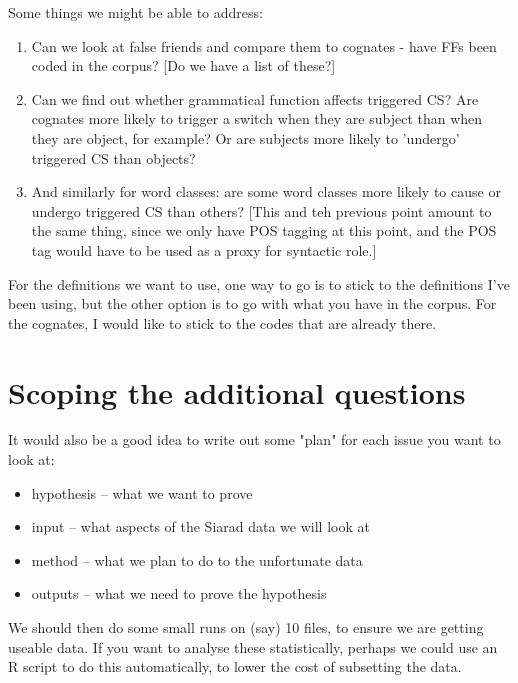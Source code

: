 \documentclass[a4paper,10pt]{article}
\begin{document}
Some things we might be able to address:
\begin{enumerate}
\item Can we look at false friends and compare them to cognates - have FFs been coded in the corpus? [Do we have a list of these?]
\item Can we find out whether grammatical function affects triggered CS? Are cognates more likely to trigger a switch when they are subject than when they are object, for example? Or are subjects more likely to 'undergo' triggered CS than objects?
\item And similarly for word classes: are some word classes more likely to cause or undergo triggered CS than others? [This and teh previous point amount to the same thing, since we only have POS tagging at this point, and the POS tag would have to be used as a proxy for syntactic role.]                                                                                                                \end{enumerate}

For the definitions we want to use, one way to go is to stick to the definitions I've been using, but the other option is to go with what you have in the corpus. For the cognates, I would like to stick to the codes that are already there.


\section{Scoping the additional questions}

It would also be a good idea to write out some "plan" for each issue you want 
to look at:
\begin{itemize}
\itemsep-0.4em 
\item hypothesis -- what we want to prove
\item input -- what aspects of the Siarad data we will look at
\item method -- what we plan to do to the unfortunate data
\item outputs -- what we need to prove the hypothesis
\end{itemize}

We should then do some small runs on (say) 10 files, to ensure we are getting useable data.  If you want to analyse these statistically, perhaps we could use an R script to do this automatically, to lower the cost of subsetting the data.









 
\end{document}
